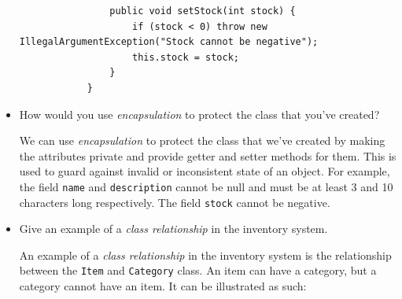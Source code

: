 \documentclass[12pt,titlepage]{article}
\begin{document}
\begin{itemize}
{\begin{verbatim}
                public void setStock(int stock) {
                    if (stock < 0) throw new IllegalArgumentException("Stock cannot be negative");
                    this.stock = stock;
                }
            }
        \end{verbatim}

    }
    \pagebreak
    \item {
        How would you use \textit{encapsulation} to protect the class that you've created?

        We can use \textit{encapsulation} to protect the class that we've created by making the
        attributes private and provide getter and setter methods for them.
        This is used to guard against invalid or inconsistent state of an object. For example,
        the field \texttt{name} and \texttt{description} cannot be null and must be at least
        3 and 10 characters long respectively. The field \texttt{stock} cannot be negative.
    }
    \item {
        Give an example of a \textit{class relationship} in the inventory system.

        An example of a \textit{class relationship} in the inventory system is the relationship
        between the \texttt{Item} and \texttt{Category} class. An item can have a category, but
        a category cannot have an item. It can be illustrated as such:

        }
\end{itemize}
\end{document}
